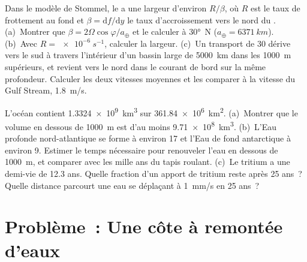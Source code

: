 \begin{exercise}[$\star\star\star$]\label{exo:b1:ocean-circulation:11}
Dans le modèle de Stommel, le  a une largeur d'environ $R/\beta$,
où $R$ est le taux de frottement au fond et $\beta = \mathrm df/\mathrm dy$ le
taux d'accroissement vers le nord du . (a)~Montrer que $\beta = 2\Omega
\cos\varphi/a_\oplus$ et le calculer à \ang{30}~N ($a_\oplus = \qty{6371}{km}$).
(b)~Avec $R = \qty{e-6}{s^{-1}}$, calculer la largeur. (c)~Un transport de
\qty{30}{\sverdrup} dérive vers le sud à travers l'intérieur d'un bassin large de \qty{5000}{km}
dans les \qty{1000}{m} supérieurs, et revient vers le nord dans le courant de bord sur la même
profondeur. Calculer les deux vitesses moyennes et les comparer à la vitesse du Gulf Stream,
\qty{1.8}{m/s}.
\end{exercise}

\begin{exercise}[$\star\star\star$]\label{exo:b1:ocean-circulation:12}
L'océan contient \qty{1.3324e9}{km^3} sur \qty{361.84e6}{km^2}. (a)~Montrer que le
volume en dessous de \qty{1000}{m} est d'au moins \qty{9.71e8}{km^3}. (b)~L'Eau
profonde nord-atlantique se forme à environ \qty{17}{\sverdrup} et l'Eau de fond antarctique à environ
\qty{9}{\sverdrup}. Estimer le temps nécessaire pour renouveler l'eau en dessous de
\qty{1000}{m}, et comparer avec les mille ans du tapis roulant. (c)~Le tritium a une
demi-vie de 12.3 ans. Quelle fraction d'un apport de tritium reste après 25 ans~? Quelle
distance parcourt une eau se déplaçant à \qty{1}{mm/s} en 25 ans~?
\end{exercise}

\section{Problème~: Une côte à remontée d'eaux}

